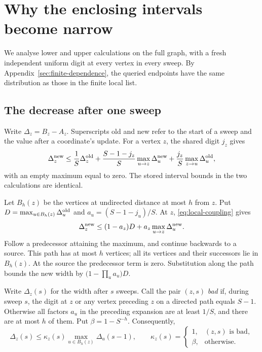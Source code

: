 \section{Why the enclosing intervals become narrow}\label{app:coupling}

We analyse lower and upper calculations on the full graph, with a
fresh independent uniform digit at every vertex in every sweep. By
Appendix~\ref{sec:finite-dependence}, the queried endpoints have the
same distribution as those in the finite local list.

\subsection{The decrease after one sweep}
Write $\Delta_z=B_z-A_z$. Superscripts old and new refer to the start
of a sweep and the value after a coordinate's update. For a
vertex $z$, the shared digit $j_z$ gives
\begin{equation}\label{eq:local-coupling}
\Delta_z^{\rm new}\le
\frac1S\Delta_z^{\rm old}
+\frac{S-1-j_z}{S}\max_{u\to z}\Delta_u^{\rm new}
+\frac{j_z}{S}\max_{z\to u}\Delta_u^{\rm old},
\end{equation}
with an empty maximum equal to zero. The stored interval bounds in the two calculations are identical.

Let $B_h(z)$ be the vertices at undirected distance at most $h$ from $z$. Put
$D=\max_{u\in B_h(z)}\Delta_u^{\rm old}$ and
$a_u=(S-1-j_u)/S$. At $z$, \eqref{eq:local-coupling} gives
\[
\Delta_z^{\rm new}\le(1-a_z)D+
                           a_z\max_{u\to z}\Delta_u^{\rm new}.
\]
Follow a predecessor attaining the maximum, and continue backwards to a
source. This path has at most $h$ vertices; all its vertices and their
successors lie in $B_h(z)$. At the source the predecessor term is zero.
Substitution along the path bounds the new width by
$\bigl(1-\prod_u a_u\bigr)D$.

Write $\Delta_z(s)$ for the width after $s$ sweeps.
Call the pair $(z,s)$ \emph{bad} if, during sweep $s$, the digit at $z$
or any vertex preceding $z$ on a directed path equals $S-1$. Otherwise all factors $a_u$ in the
preceding expansion are at least $1/S$, and there are at most $h$ of
them. Put $\beta=1-S^{-h}$. Consequently,
\begin{equation}\label{eq:local-one-sweep}
\Delta_z(s)\le\kappa_z(s)\max_{u\in B_h(z)}\Delta_u(s-1),
\qquad
\kappa_z(s)=
\begin{cases}
1,&(z,s)\text{ is bad},\\
\beta,&\text{otherwise}.
\end{cases}
\end{equation}

